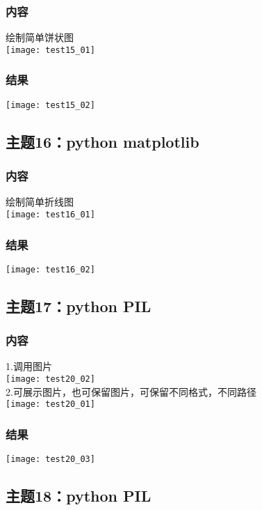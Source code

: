 \documentclass{article}
\begin{document}
\subsubsection{内容}
绘制简单饼状图\\
\texttt{[image: test15\_01]}\\
\subsubsection{结果}  
\texttt{[image: test15\_02]}\\
\vspace{1cm}
\subsection{主题16：python matplotlib}  
\subsubsection{内容}
绘制简单折线图\\
\texttt{[image: test16\_01]}\\
\subsubsection{结果}  
\texttt{[image: test16\_02]}\\
\vspace{1cm}
\subsection{主题17：python PIL}  
\subsubsection{内容}
1.调用图片\\
\texttt{[image: test20\_02]}\\
2.可展示图片，也可保留图片，可保留不同格式，不同路径\\
\texttt{[image: test20\_01]}\\
\subsubsection{结果}  
\texttt{[image: test20\_03]}\\
\newpage
\thispagestyle{empty}
\subsection{主题18：python PIL}  
\end{document}
